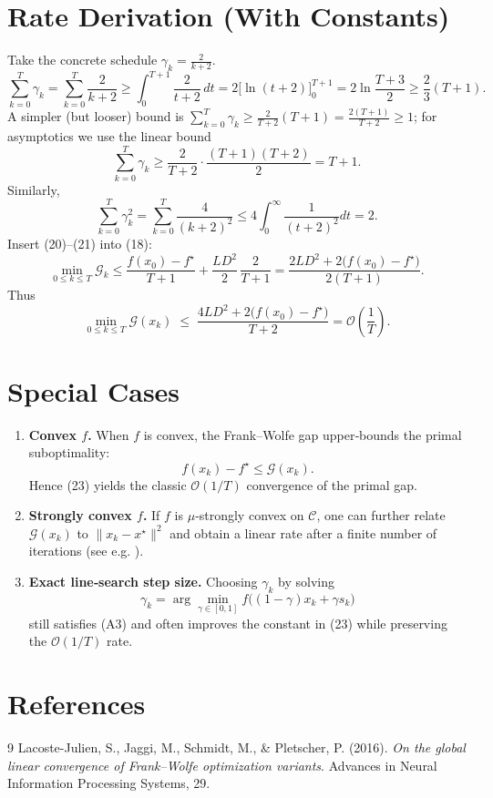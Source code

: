 \documentclass{article}
\begin{document}
\section*{Rate Derivation (With Constants)}
Take the concrete schedule $\gamma_k = \frac{2}{k+2}$.
\[
\sum_{k=0}^{T}\gamma_k
   =\sum_{k=0}^{T}\frac{2}{k+2}
   \ge \int_{0}^{T+1}\frac{2}{t+2}\,dt
   =2\bigl[\ln(t+2)\bigr]_{0}^{T+1}
   =2\ln\!\frac{T+3}{2}
   \ge \frac{2}{3}(T+1) .
\tag{19}
\]
A simpler (but looser) bound is $\sum_{k=0}^{T}\gamma_k \ge \frac{2}{T+2}(T+1)=\frac{2(T+1)}{T+2}\ge 1$; for asymptotics we use the linear bound
\[
\sum_{k=0}^{T}\gamma_k \ge \frac{2}{T+2}\cdot\frac{(T+1)(T+2)}{2}=T+1 .
\tag{20}
\]
Similarly,
\[
\sum_{k=0}^{T}\gamma_k^{2}
   =\sum_{k=0}^{T}\frac{4}{(k+2)^{2}}
   \le 4\int_{0}^{\infty}\frac{1}{(t+2)^{2}}dt
   =2 .
\tag{21}
\]
Insert (20)–(21) into (18):
\[
\min_{0\le k\le T}\mathcal G_k
\le \frac{f(x_0)-f^\star}{T+1}
   +\frac{L D^{2}}{2}\,\frac{2}{T+1}
= \frac{2L D^{2}+2\bigl(f(x_0)-f^\star\bigr)}{2(T+1)} .
\tag{22}
\]
Thus
\[
\boxed{\displaystyle 
\min_{0\le k\le T}\mathcal G(x_k)
\;\le\;
\frac{4L D^{2}+2\bigl(f(x_0)-f^\star\bigr)}{T+2}
= \mathcal O\!\left(\frac{1}{T}\right)} .
\tag{23}
\]

\section*{Special Cases}
\begin{enumerate}[label=\arabic*.]
\item \textbf{Convex $f$.}  When $f$ is convex, the Frank–Wolfe gap upper‑bounds the primal suboptimality:
\[
f(x_k)-f^\star \le \mathcal G(x_k) .
\]
Hence (23) yields the classic $\mathcal O(1/T)$ convergence of the primal gap.
\item \textbf{Strongly convex $f$.}  If $f$ is $\mu$‑strongly convex on $\mathcal C$, one can further relate $\mathcal G(x_k)$ to $\|x_k-x^\star\|^{2}$ and obtain a linear rate after a finite number of iterations (see e.g. \cite{lacoste2016convergence}).
\item \textbf{Exact line‑search step size.}  Choosing $\gamma_k$ by solving
\[
\gamma_k = \arg\min_{\gamma\in[0,1]} f\bigl((1-\gamma)x_k+\gamma s_k\bigr)
\]
still satisfies (A3) and often improves the constant in (23) while preserving the $\mathcal O(1/T)$ rate.
\end{enumerate}

\section*{References}
\begin{thebibliography}{9}
Lacoste-Julien, S., Jaggi, M., Schmidt, M., \& Pletscher, P. (2016). \emph{On the global linear convergence of Frank–Wolfe optimization variants}. Advances in Neural Information Processing Systems, 29.
\end{thebibliography}
\end{document}

